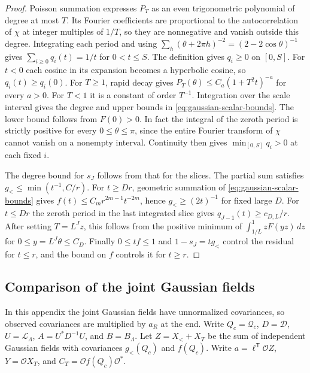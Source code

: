 \documentclass[11pt]{article}
\theoremstyle{definition}
\begin{document}
\begin{proof}
Poisson summation expresses \(P_T\) as an even trigonometric polynomial
of degree at most \(T\). Its Fourier coefficients are proportional to
the autocorrelation of \(\chi\) at integer multiples of \(1/T\), so
they are nonnegative and vanish outside this degree. Integrating each
period and using
\(\sum_h(\theta+2\pi h)^{-2}=(2-2\cos\theta)^{-1}\) gives
\(\sum_{i\ge0}q_i(t)=1/t\) for \(0<t\le S\).
The definition gives \(q_i\ge0\) on \([0,S]\). For \(t<0\) each cosine
in its expansion becomes a hyperbolic cosine, so \(q_i(t)\ge q_i(0)\).
For \(T\ge1\), rapid decay gives
\(P_T(\theta)\le C_a(1+T^2t)^{-a}\) for every \(a>0\). For
\(T<1\) it is a constant of order \(T^{-1}\).
Integration over the scale interval gives the degree and upper
bounds in \eqref{eq:gaussian-scalar-bounds}. The lower bound follows
from \(F(0)>0\). In fact the integral of the zeroth period is strictly
positive for every \(0\le\theta\le\pi\), since the entire Fourier
transform of \(\chi\) cannot vanish on a nonempty interval. Continuity
then gives \(\min_{[0,S]}q_i>0\) at each fixed \(i\).

The degree bound for \(s_J\) follows from that for the slices.
The partial sum satisfies \(g_<\le\min(t^{-1},C/r)\). For \(t\ge D r\), geometric summation
of \eqref{eq:gaussian-scalar-bounds} gives
\(f(t)\le C_m r^{2m-1}t^{-2m}\), hence \(g_<\ge(2t)^{-1}\) for fixed
large \(D\). For \(t\le Dr\) the zeroth period in the last integrated
slice gives \(q_{J-1}(t)\ge c_{D,L}/r\). After setting \(T=L^J z\),
this follows from the positive minimum of
\(\int_{1/L}^1 z F(yz)\,dz\) for \(0\le y=L^J\theta\le C_D\).
Finally \(0\le tf\le1\) and \(1-s_J=tg_<\) control the residual for
\(t\le r\), and the bound on \(f\) controls it for \(t\ge r\).
\end{proof}

\subsection{Comparison of the joint Gaussian fields}
\label{app:gaussian-joint}
In this appendix the joint Gaussian fields have unnormalized
covariances, so observed covariances are multiplied by \(a_R\) at the
end. Write \(Q_c=\mathcal Q_c\), \(D=\mathcal D\),
\(U=\mathcal L_\Lambda\), \(A=U^*D^{-1}U\), and \(B=B_\Lambda\).
Let \(Z=X_<+X_T\) be the sum of independent Gaussian fields with
covariances \(g_<(Q_c)\) and \(f(Q_c)\). Write
\(a=\ell^{\mathsf T}\mathcal O Z\), \(Y=\mathcal O X_T\), and
\(C_T=\mathcal O f(Q_c)\mathcal O^*\).
\end{document}

